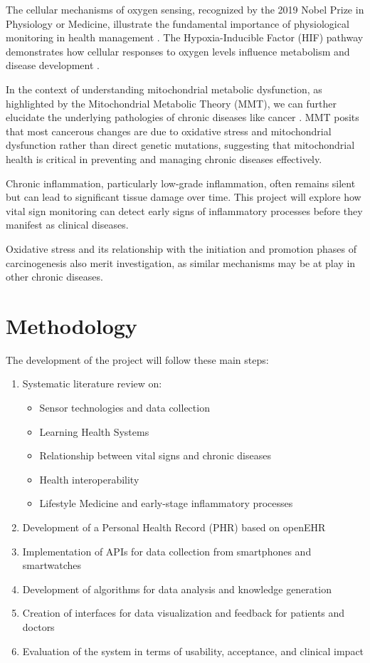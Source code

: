 The cellular mechanisms of oxygen sensing, recognized by the 2019 Nobel Prize in Physiology or Medicine, illustrate the fundamental importance of physiological monitoring in health management \cite{nobel2019physiology}. The Hypoxia-Inducible Factor (HIF) pathway demonstrates how cellular responses to oxygen levels influence metabolism and disease development \cite{bosco2020mitochondrial}.

In the context of understanding mitochondrial metabolic dysfunction, as highlighted by the Mitochondrial Metabolic Theory (MMT), we can further elucidate the underlying pathologies of chronic diseases like cancer \cite{bosco2020mitochondrial}. MMT posits that most cancerous changes are due to oxidative stress and mitochondrial dysfunction rather than direct genetic mutations, suggesting that mitochondrial health is critical in preventing and managing chronic diseases effectively.

Chronic inflammation, particularly low-grade inflammation, often remains silent but can lead to significant tissue damage over time. This project will explore how vital sign monitoring can detect early signs of inflammatory processes before they manifest as clinical diseases.

Oxidative stress and its relationship with the initiation and promotion phases of carcinogenesis also merit investigation, as similar mechanisms may be at play in other chronic diseases.

\section{Methodology} \label{sec:methodology}

The development of the project will follow these main steps:

\begin{enumerate}
\item Systematic literature review on:
   \begin{itemize}
   \item Sensor technologies and data collection
   \item Learning Health Systems
   \item Relationship between vital signs and chronic diseases
   \item Health interoperability
   \item Lifestyle Medicine and early-stage inflammatory processes
   \end{itemize}
\item Development of a Personal Health Record (PHR) based on openEHR
\item Implementation of APIs for data collection from smartphones and smartwatches
\item Development of algorithms for data analysis and knowledge generation
\item Creation of interfaces for data visualization and feedback for patients and doctors
\item Evaluation of the system in terms of usability, acceptance, and clinical impact
\end{enumerate}

